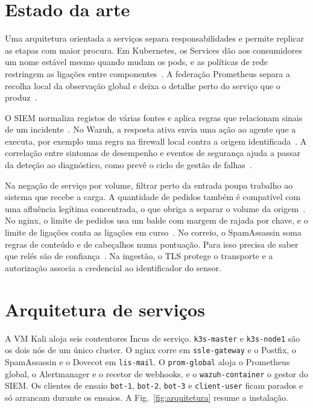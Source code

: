 \documentclass[conference,a4paper]{IEEEtran}
\newcommand{\code}[1]{\texttt{\small #1}}
\begin{document}
\section{Estado da arte}
Uma arquitetura orientada a serviços separa responsabilidades e permite replicar as etapas com maior procura. Em Kubernetes, os Services dão aos consumidores um nome estável mesmo quando mudam os pods, e as políticas de rede restringem as ligações entre componentes~\cite{knet}. A federação Prometheus separa a recolha local da observação global e deixa o detalhe perto do serviço que o produz~\cite{prom}.

O SIEM normaliza registos de várias fontes e aplica regras que relacionam sinais de um incidente~\cite{bhatt,wazuh}. No Wazuh, a resposta ativa envia uma ação ao agente que a executa, por exemplo uma regra na firewall local contra a origem identificada~\cite{wazuhar}. A correlação entre sintomas de desempenho e eventos de segurança ajuda a passar da deteção ao diagnóstico, como prevê o ciclo de gestão de falhas~\cite{m3400}.

Na negação de serviço por volume, filtrar perto da entrada poupa trabalho ao sistema que recebe a carga. A quantidade de pedidos também é compatível com uma afluência legítima concentrada, o que obriga a separar o volume da origem~\cite{mirkovic,jung}. No nginx, o limite de pedidos usa um balde com margem de rajada por chave, e o limite de ligações conta as ligações em curso~\cite{nginx}. No correio, o SpamAssassin soma regras de conteúdo e de cabeçalhos numa pontuação. Para isso precisa de saber que relés são de confiança~\cite{sa}. Na ingestão, o TLS protege o transporte e a autorização associa a credencial ao identificador do sensor.

\section{Arquitetura de serviços}
A VM Kali aloja seis contentores Incus de serviço. \code{k3s-master} e \code{k3s-node1} são os dois nós de um único cluster. O nginx corre em \code{ssle-gateway} e o Postfix, o SpamAssassin e o Dovecot em \code{lis-mail}. O \code{prom-global} aloja o Prometheus global, o Alertmanager e o recetor de webhooks, e o \code{wazuh-container} o gestor do SIEM. Os clientes de ensaio \code{bot-1}, \code{bot-2}, \code{bot-3} e \code{client-user} ficam parados e só arrancam durante os ensaios. A Fig.~\ref{fig:arquitetura} resume a instalação.
\end{document}
